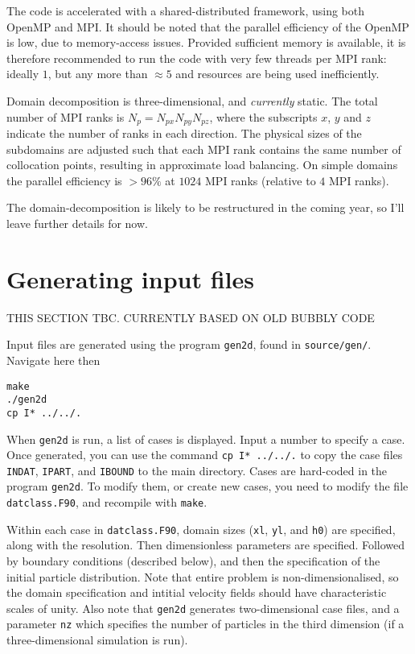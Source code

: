 \documentclass[notitlepage]{article}
\begin{document}
The code is accelerated with a shared-distributed framework, using both OpenMP and MPI. It should be noted that the parallel efficiency of the OpenMP is low, due to memory-access issues. Provided sufficient memory is available, it is therefore recommended to run the code with very few threads per MPI rank: ideally $1$, but any more than $\approx{5}$ and resources are being used inefficiently.

Domain decomposition is three-dimensional, and \emph{currently} static. The total number of MPI ranks is $N_{p}=N_{px}N_{py}N_{pz}$, where the subscripts $x$, $y$ and $z$ indicate the number of ranks in each direction. The physical sizes of the subdomains are adjusted such that each MPI rank contains the same number of collocation points, resulting in approximate load balancing. On simple domains the parallel efficiency is $>96\%$ at $1024$ MPI ranks (relative to $4$ MPI ranks).

The domain-decomposition is likely to be restructured in the coming year, so I'll leave further details for now.

\section{Generating input files}


THIS SECTION TBC. CURRENTLY BASED ON OLD BUBBLY CODE

Input files are generated using the program \verb|gen2d|, found in \verb|source/gen/|. Navigate here then
\begin{verbatim}
make
./gen2d
cp I* ../../.
\end{verbatim}
When \verb|gen2d| is run, a list of cases is displayed. Input a number to specify a case. Once generated, you can use the command \verb|cp I* ../../.| to copy the case files \verb|INDAT|, \verb|IPART|, and \verb|IBOUND| to the main directory. Cases are hard-coded in the program \verb|gen2d|. To modify them, or create new cases, you need to modify the file \verb|datclass.F90|, and recompile with \verb|make|.

Within each case in \verb|datclass.F90|, domain sizes (\verb|xl|, \verb|yl|, and \verb|h0|) are specified, along with the resolution. Then dimensionless parameters are specified. Followed by boundary conditions (described below), and then the specification of the initial particle distribution. Note that entire problem is non-dimensionalised, so the domain specification and intitial velocity fields should have characteristic scales of unity. Also note that \verb|gen2d| generates two-dimensional case files, and a parameter \verb|nz| which specifies the number of particles in the third dimension (if a three-dimensional simulation is run).
\end{document}
